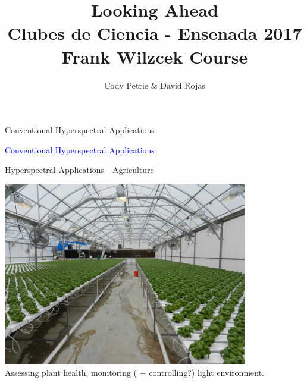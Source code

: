 \documentclass{beamer}
\title[{\color{white}{Day 5}}]{{\Huge Looking Ahead} \\ {\normalsize Clubes de Ciencia - Ensenada 2017 \\ Frank Wilzcek Course}}
\author{Cody Petrie \& David Rojas}
\institute{Universidad Aut\'onoma de Baja California}
\date{}
\begin{document}
\begin{frame}
   \titlepage
\end{frame}



\begin{frame}{Conventional Hyperspectral Applications}
   \begin{center}
      \Huge \textcolor{blue}{Conventional Hyperspectral Applications}
   \end{center}
\end{frame}

\begin{frame}{Hyperspectral Applications - Agriculture}
   \begin{center}
      \includegraphics[width=0.8\textwidth]{figures/agriculture.jpg}
      \\Assessing plant health, monitoring ( + controlling?) light environment.
   \end{center}
\end{frame}
\end{document}
